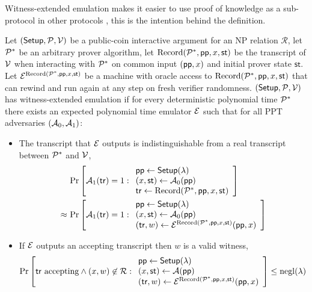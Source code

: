 Witness-extended emulation makes it easier to use proof of knowledge as a sub-protocol in other protocols \cite{lindell2003parallel}, this is the intention behind the definition.

\begin{definition}
Let $(\mathsf{Setup}, \mathcal{P}, \mathcal{V})$ be a public-coin interactive argument for an NP relation $\mathcal{R}$, let $\mathcal{P}^*$ be an arbitrary prover algorithm, let $\mathrm{Record}(\mathcal{P}^*, \mathsf{pp}, x, \mathsf{st})$ be the transcript of $\mathcal{V}$ when interacting with $\mathcal{P}^*$ on common input $(\mathsf{pp}, x)$ and initial prover state $\mathsf{st}$. Let $\mathcal{E}^{\mathrm{Record}(\mathcal{P}^*, \mathsf{pp}, x, \mathsf{st})}$ be a machine with oracle access to $\mathrm{Record}(\mathcal{P}^*, \mathsf{pp}, x, \mathsf{st})$ that can rewind and run again at any step on fresh verifier randomness. $(\mathsf{Setup}, \mathcal{P}, \mathcal{V})$ has \textup{witness-extended emulation} if for every deterministic polynomial time $\mathcal{P}^*$ there exists an expected polynomial time emulator $\mathcal{E}$ such that for all PPT adversaries $(\mathcal{A}_0, \mathcal{A}_1)$:
\begin{itemize}
    \item The transcript that $\mathcal{E}$ outputs is indistinguishable from a real transcript between $\mathcal{P}^*$ and $\mathcal{V}$,
    \begin{align*}
    & \pr{\mA_1(\mathsf{tr}) = 1 : \begin{array}{l}
    \pp \gets \aSetup(\lambda) \\
    (x, \mathsf{st}) \gets \mA_0(\pp) \\
    \mathsf{tr} \gets \Record(\mP^*, \pp, x, \mathsf{st})
    \end{array}} \\
    \approx\ 
    & \pr{\mA_1(\mathsf{tr}) = 1 :
    \begin{array}{l}
    \pp \gets \aSetup(\lambda) \\
    (x, \mathsf{st}) \gets \mA_0(\pp) \\
    (\mathsf{tr}, w) \gets \mE^{\Record(\mP^*, \pp, x, \mathsf{st})}(\pp, x)
    \end{array}
    }
    \end{align*}
    \item If $\mathcal{E}$ outputs an accepting transcript then $w$ is a valid witness,
    \begin{align*}
    \mathrm{Pr} \left[ \mathsf{tr} \text{ \textup{accepting}} \wedge (x, w) \not\in \mathcal{R} :
    \begin{array}{l}
    \mathsf{pp} \gets \mathsf{Setup}(\lambda) \\
    (x, \mathsf{st}) \gets \mathcal{A}(\mathsf{pp}) \\
    (\mathsf{tr}, w) \gets \mathcal{E}^{\mathrm{Record}(\mathcal{P}^*, \mathsf{pp}, x, \mathsf{st})}(\mathsf{pp}, x)
    \end{array}
     \right] \le \mathrm{negl}(\lambda)
    \end{align*}
\end{itemize}
\end{definition}

